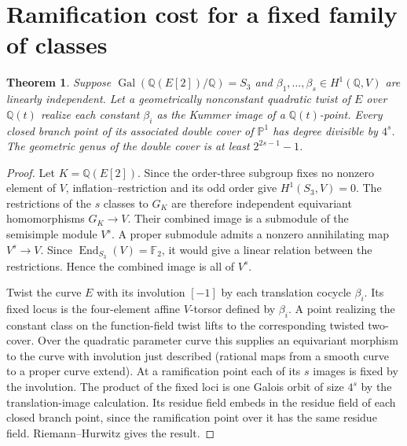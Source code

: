 \documentclass[11pt]{article}
\newtheorem{theorem}{Theorem}[section]\newtheorem{lemma}[theorem]{Lemma}\newtheorem{corollary}[theorem]{Corollary}
\newcommand{\Q}{\mathbb Q}\newcommand{\F}{\mathbb F}\newcommand{\Z}{\mathbb Z}
\begin{document}
\section{Ramification cost for a fixed family of classes}
\begin{theorem}
Suppose $\operatorname{Gal}(\Q(E[2])/\Q)=S_3$ and $\beta_1,\ldots,\beta_s\in H^1(\Q,V)$ are linearly independent. Let a geometrically nonconstant quadratic twist of $E$ over $\Q(t)$ realize each constant $\beta_i$ as the Kummer image of a $\Q(t)$-point. Every closed branch point of its associated double cover of $\mathbb P^1$ has degree divisible by $4^s$. The geometric genus of the double cover is at least $2^{2s-1}-1$.
\end{theorem}
\begin{proof}
Let $K=\Q(E[2])$. Since the order-three subgroup fixes no nonzero element of $V$, inflation--restriction and its odd order give $H^1(S_3,V)=0$. The restrictions of the $s$ classes to $G_K$ are therefore independent equivariant homomorphisms $G_K\to V$. Their combined image is a submodule of the semisimple module $V^s$. A proper submodule admits a nonzero annihilating map $V^s\to V$. Since $\operatorname{End}_{S_3}(V)=\F_2$, it would give a linear relation between the restrictions. Hence the combined image is all of $V^s$.

Twist the curve $E$ with its involution $[-1]$ by each translation cocycle $\beta_i$. Its fixed locus is the four-element affine $V$-torsor defined by $\beta_i$. A point realizing the constant class on the function-field twist lifts to the corresponding twisted two-cover. Over the quadratic parameter curve this supplies an equivariant morphism to the curve with involution just described (rational maps from a smooth curve to a proper curve extend). At a ramification point each of its $s$ images is fixed by the involution. The product of the fixed loci is one Galois orbit of size $4^s$ by the translation-image calculation. Its residue field embeds in the residue field of each closed branch point, since the ramification point over it has the same residue field. Riemann--Hurwitz gives the result.
\end{proof}
\end{document}
